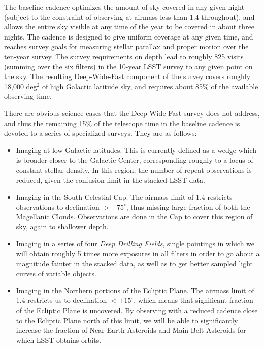 The baseline cadence optimizes the amount of sky covered in any given
night (subject to the constraint of observing at airmass less than 1.4
throughout), and allows the entire sky visible at any time of the year
to be covered in about three nights.  The cadence is designed to give
uniform coverage at any given time, and reaches survey goals for
measuring stellar parallax and proper motion over the ten-year survey.
The survey requirements on depth lead to roughly 825 visits (summing
over the six filters) in the 10-year LSST survey to any given point on
the sky.  The resulting Deep-Wide-Fast component of the survey covers
roughly 18,000 deg$^2$ of high Galactic latitude sky, and requires about
85\% of the available observing time.

There are obvious science cases that the Deep-Wide-Fast survey does
not address, and thus the remaining 15\% of the telescope time in the
baseline cadence is devoted to a series of specialized surveys.  They
are as follows:
\begin{itemize}
\item Imaging at low Galactic latitudes.  This is currently defined as
  a wedge which is broader closer to the Galactic Center,
  corresponding roughly to a locus of constant stellar density.  In
  this region, the number of repeat observations is reduced, given the
  confusion limit in the stacked LSST data.
\item Imaging in the South Celestial Cap.  The airmass limit of 1.4
  restricts observations to declination $> -75^\circ$, thus missing
  large fraction of both the Magellanic Clouds.
  Observations are done in the Cap to cover this region of sky, again
  to shallower depth.
\item Imaging in a series of four {\em Deep Drilling Fields}, single
  pointings in which
  we will obtain roughly 5 times more exposures in all
  filters in order to go about a magnitude fainter in the stacked
  data, as well as to get better sampled light curves of variable
  objects.
\item Imaging in the Northern portions of the Ecliptic Plane.  The
  airmass limit of 1.4 restricts us to declination $< +15^\circ$, which
  means that significant fraction of the Ecliptic Plane
  is uncovered.  By observing with a reduced cadence close to the
  Ecliptic Plane north of this limit, we will be able to significantly
  increase the fraction of Near-Earth Asteroids and Main Belt
  Asteroids for which LSST obtains orbits.
\end{itemize}

